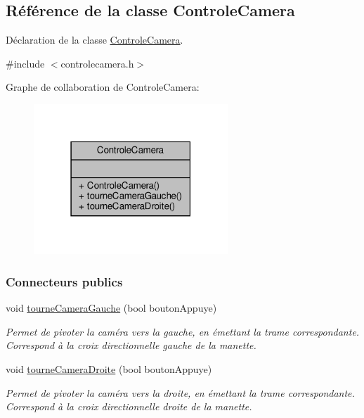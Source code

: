 \hypertarget{class_controle_camera}{}\subsection{Référence de la classe Controle\+Camera}
\label{class_controle_camera}


Déclaration de la classe \hyperlink{class_controle_camera}{Controle\+Camera}.  




{\ttfamily \#include $<$controlecamera.\+h$>$}



Graphe de collaboration de Controle\+Camera\+:
\nopagebreak
\begin{figure}[H]
\begin{center}
\leavevmode
\includegraphics[width=207pt]{class_controle_camera__coll__graph}
\end{center}
\end{figure}
\subsubsection*{Connecteurs publics}
\begin{DoxyCompactItemize}
\item 
void \hyperlink{class_controle_camera_a119562aacbb4c0fbd4e5aa27a05ce7cc}{tourne\+Camera\+Gauche} (bool bouton\+Appuye)
\begin{DoxyCompactList}\small\item\em Permet de pivoter la caméra vers la gauche, en émettant la trame correspondante. Correspond à la croix directionnelle gauche de la manette. \end{DoxyCompactList}\item 
void \hyperlink{class_controle_camera_aac294c4e98a912199ba32d686e52f7ef}{tourne\+Camera\+Droite} (bool bouton\+Appuye)
\begin{DoxyCompactList}\small\item\em Permet de pivoter la caméra vers la droite, en émettant la trame correspondante. Correspond à la croix directionnelle droite de la manette. \end{DoxyCompactList}\end{DoxyCompactItemize}
